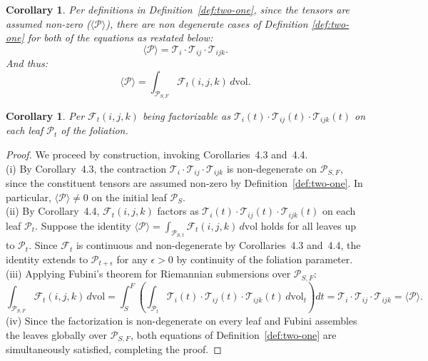 \documentclass[10pt]{article}
\theoremstyle{plain}
\newtheorem{corollary}[theorem]{Corollary}
\theoremstyle{definition}
\theoremstyle{remark}
\begin{document}
\begin{corollary}
\label{cor:tensor-nz}
  Per definitions in Definition~\ref{def:two-one}, since the tensors are assumed non-zero ($\langle \mathcal{P} \rangle$), there are non degenerate cases of Definition \ref{def:two-one} for both of the equations as restated below:
  \begin{equation}
    \langle \mathcal{P} \rangle = \mathcal{T}_i \cdot \mathcal{T}_{ij} \cdot \mathcal{T}_{ijk}.
  \end{equation}
  And thus:
  \begin{equation}
    \langle \mathcal{P} \rangle = \int_{\mathcal{P}_{S,F}} \mathcal{F}_{t}(i, j, k) \, d\mathrm{vol}.
  \end{equation}
\end{corollary}

\begin{corollary}
\label{cor:three}
  Per $\mathcal{F}_t(i, j, k)$ being factorizable as $\mathcal{T}_i(t) \cdot \mathcal{T}_{ij}(t) \cdot \mathcal{T}_{ijk}(t)$ on each leaf $\mathcal{P}_t$ of the foliation.
\end{corollary}

\begin{proof}
\label{proof:construc}
We proceed by construction, invoking Corollaries~4.3 and~4.4.\\
(i) By Corollary~4.3, the contraction $\mathcal{T}_i \cdot \mathcal{T}_{ij} \cdot \mathcal{T}_{ijk}$ is non-degenerate on $\mathcal{P}_{S,F}$, since the constituent tensors are assumed non-zero by Definition~\ref{def:two-one}. In particular, $\langle \mathcal{P} \rangle \neq 0$ on the initial leaf $\mathcal{P}_S$.\\
(ii) By Corollary~4.4, $\mathcal{F}_t(i,j,k)$ factors as $\mathcal{T}_i(t) \cdot \mathcal{T}_{ij}(t) \cdot \mathcal{T}_{ijk}(t)$ on each leaf $\mathcal{P}_t$. Suppose the identity $\langle \mathcal{P} \rangle = \int_{\mathcal{P}_{S,t}} \mathcal{F}_t(i,j,k)\,d\mathrm{vol}$ holds for all leaves up to $\mathcal{P}_t$. Since $\mathcal{F}_t$ is continuous and non-degenerate by Corollaries~4.3 and~4.4, the identity extends to $\mathcal{P}_{t+\epsilon}$ for any $\epsilon > 0$ by continuity of the foliation parameter.\\
(iii) Applying Fubini's theorem for Riemannian submersions over $\mathcal{P}_{S,F}$:
\begin{equation}
  \int_{\mathcal{P}_{S,F}} \mathcal{F}_t(i,j,k)\,d\mathrm{vol}
  = \int_{S}^{F} \left(\int_{\mathcal{P}_t} \mathcal{T}_i(t) \cdot \mathcal{T}_{ij}(t) \cdot \mathcal{T}_{ijk}(t)\,d\mathrm{vol}_t\right) dt
  = \mathcal{T}_i \cdot \mathcal{T}_{ij} \cdot \mathcal{T}_{ijk}
  = \langle \mathcal{P} \rangle.
\end{equation}
(iv) Since the factorization is non-degenerate on every leaf and Fubini assembles the leaves globally over $\mathcal{P}_{S,F}$, both equations of Definition~\ref{def:two-one} are simultaneously satisfied, completing the proof.
\end{proof}
\end{document}
